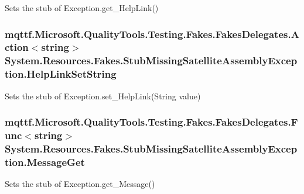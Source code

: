 Sets the stub of Exception.\-get\-\_\-\-Help\-Link()

\hypertarget{class_system_1_1_resources_1_1_fakes_1_1_stub_missing_satellite_assembly_exception_a88bb50dc44d953ce95ff012851a6eee4}{
\subsubsection[{Help\-Link\-Set\-String}]{\setlength{\rightskip}{0pt plus 5cm}mqttf.\-Microsoft.\-Quality\-Tools.\-Testing.\-Fakes.\-Fakes\-Delegates.\-Action$<$string$>$ System.\-Resources.\-Fakes.\-Stub\-Missing\-Satellite\-Assembly\-Exception.\-Help\-Link\-Set\-String}}\label{class_system_1_1_resources_1_1_fakes_1_1_stub_missing_satellite_assembly_exception_a88bb50dc44d953ce95ff012851a6eee4}


Sets the stub of Exception.\-set\-\_\-\-Help\-Link(\-String value)

\hypertarget{class_system_1_1_resources_1_1_fakes_1_1_stub_missing_satellite_assembly_exception_aa5152810ed0cd2002f5006dd7b505956}{
\subsubsection[{Message\-Get}]{\setlength{\rightskip}{0pt plus 5cm}mqttf.\-Microsoft.\-Quality\-Tools.\-Testing.\-Fakes.\-Fakes\-Delegates.\-Func$<$string$>$ System.\-Resources.\-Fakes.\-Stub\-Missing\-Satellite\-Assembly\-Exception.\-Message\-Get}}\label{class_system_1_1_resources_1_1_fakes_1_1_stub_missing_satellite_assembly_exception_aa5152810ed0cd2002f5006dd7b505956}


Sets the stub of Exception.\-get\-\_\-\-Message()


